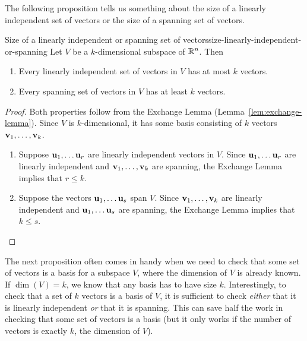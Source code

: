 The following proposition tells us something about the size of a
linearly independent set of vectors or the size of a spanning set of
vectors.

\begin{proposition}{Size of a linearly independent or spanning set of vectors}{size-linearly-independent-or-spanning}
  Let $V$ be a $k$-dimensional subspace of $\mathbb{R}^n$. Then
  \begin{enumialphparenastyle}
    \begin{enumerate}
    \item Every linearly independent set of vectors in $V$ has at most
      $k$ vectors.
    \item Every spanning set of vectors in $V$ has at least $k$ vectors.
    \end{enumerate}
  \end{enumialphparenastyle}
\end{proposition}

\begin{proof}
  Both properties follow from the Exchange Lemma
  (Lemma~\ref{lem:exchange-lemma}). Since $V$ is $k$-dimensional, it
  has some basis consisting of $k$ vectors
  $\vect{v}_1,\ldots,\vect{v}_k$.
  \begin{enumialphparenastyle}
    \begin{enumerate}
    \item Suppose $\vect{u}_1,\ldots\vect{u}_r$ are linearly
      independent vectors in $V$. Since $\vect{u}_1,\ldots\vect{u}_r$
      are linearly independent and $\vect{v}_1,\ldots,\vect{v}_k$ are
      spanning, the Exchange Lemma implies that $r\leq k$.
    \item Suppose the vectors $\vect{u}_1,\ldots\vect{u}_s$ span
      $V$. Since $\vect{v}_1,\ldots,\vect{v}_k$ are linearly
      independent and $\vect{u}_1,\ldots\vect{u}_s$ are spanning, the
      Exchange Lemma implies that $k\leq s$.
    \end{enumerate}
  \end{enumialphparenastyle}
\end{proof}

The next proposition often comes in handy when we need to check that
some set of vectors is a basis for a subspace $V$, where the dimension
of $V$ is already known. If $\dim(V)=k$, we know that any basis has to
have size $k$. Interestingly, to check that a set of $k$ vectors is a
basis of $V$, it is sufficient to check {\em either} that it is
linearly independent {\em or} that it is spanning. This can save half
the work in checking that some set of vectors is a basis (but it only
works if the number of vectors is exactly $k$, the dimension of $V$).


